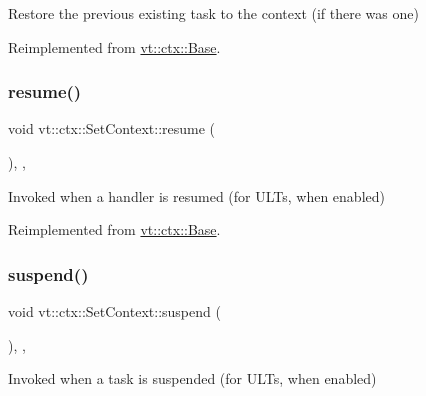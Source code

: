 Restore the previous existing task to the context (if there was one) 



Reimplemented from \hyperlink{structvt_1_1ctx_1_1_base_a113bac732b2831caa8eed11609ccaf0e}{vt\+::ctx\+::\+Base}.

\mbox{\label{structvt_1_1ctx_1_1_set_context_a5d0e979f3d601900223d0db9bb8992d3}} 
\subsubsection{\texorpdfstring{resume()}{resume()}}
{\footnotesize\ttfamily void vt\+::ctx\+::\+Set\+Context\+::resume (\begin{DoxyParamCaption}{ }\end{DoxyParamCaption})\hspace{0.3cm}{\ttfamily [final]}, {\ttfamily [override]}, {\ttfamily [virtual]}}



Invoked when a handler is resumed (for U\+L\+Ts, when enabled) 



Reimplemented from \hyperlink{structvt_1_1ctx_1_1_base_a303afabb40ed83057fbe30c744db95da}{vt\+::ctx\+::\+Base}.

\mbox{\label{structvt_1_1ctx_1_1_set_context_a6c371395c3d947e751d661f47157ba46}} 
\subsubsection{\texorpdfstring{suspend()}{suspend()}}
{\footnotesize\ttfamily void vt\+::ctx\+::\+Set\+Context\+::suspend (\begin{DoxyParamCaption}{ }\end{DoxyParamCaption})\hspace{0.3cm}{\ttfamily [final]}, {\ttfamily [override]}, {\ttfamily [virtual]}}



Invoked when a task is suspended (for U\+L\+Ts, when enabled) 



